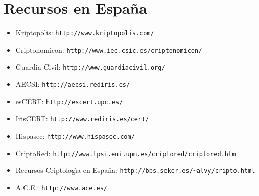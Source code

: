 \section{Recursos en Espa\~na}
\begin{itemize}
\item Kriptopolis: {\tt http://www.kriptopolis.com/}
\item Criptonomicon: {\tt http://www.iec.csic.es/criptonomicon/}
\item Guardia Civil: {\tt http://www.guardiacivil.org/} 
\item AECSI: {\tt http://aecsi.rediris.es/}
\item esCERT: {\tt http://escert.upc.es/}
\item IrisCERT: {\tt http://www.rediris.es/cert/}
\item Hispasec: {\tt http://www.hispasec.com/}
\item CriptoRed: {\tt http://www.lpsi.eui.upm.es/criptored/criptored.htm}
\item Recursos Criptolog\'{\i}a en Espa\~na: {\tt http://bbs.seker.es/\~{}alvy/cripto.html}
\item A.C.E.: {\tt http://www.ace.es/}
\end{itemize}
